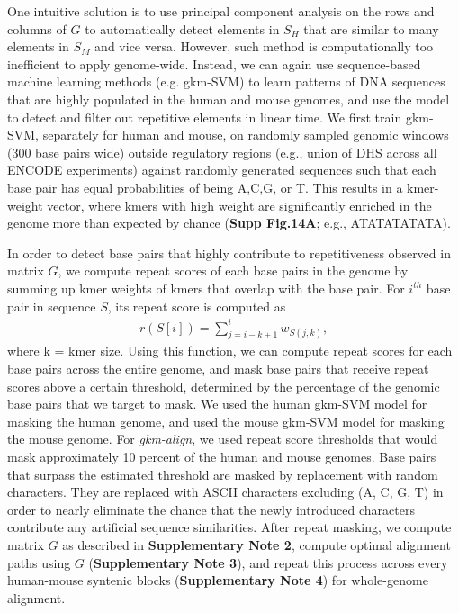 \documentclass[english]{article}
\begin{document}
One intuitive solution is to use principal component analysis on the rows and columns of $G$ to automatically detect elements in $S_H$ that are similar to many elements in $S_M$ and vice versa. However, such method is computationally too inefficient to apply genome-wide. Instead, we can again use sequence-based machine learning methods (e.g. gkm-SVM) to learn patterns of DNA sequences that are highly populated in the human and mouse genomes, and use the model to detect and filter out repetitive elements in linear time.
We first train gkm-SVM, separately for human and mouse, on randomly sampled genomic windows (300 base pairs wide) outside regulatory regions (e.g., union of DHS across all ENCODE experiments) against randomly generated sequences such that each base pair has equal probabilities of being A,C,G, or T. This results in a kmer-weight vector, where kmers with high weight are significantly enriched in the genome more than expected by chance (\textbf{Supp Fig.14A}; e.g., ATATATATATA).

In order to detect base pairs that highly contribute to repetitiveness observed in matrix $G$,  we compute repeat scores of each base pairs in the genome by summing up kmer weights of kmers that overlap with the base pair. For $i^{th}$ base pair in sequence $S$, its repeat score is computed as 
\begin{align*}
    r(S[i]) = \sum_{j=i-k+1}^{i} w_{S(j,k)},
\end{align*}
where k = kmer size. Using this function, we can compute repeat scores for each base pairs across the entire genome, and mask base pairs that receive repeat scores above a certain threshold, determined by the percentage of the genomic base pairs that we target to mask. We used the human gkm-SVM model for masking the human genome, and used the mouse gkm-SVM model for masking the mouse genome. For \textit{gkm-align}, we used repeat score thresholds that would mask approximately 10 percent of the human and mouse genomes. Base pairs that surpass the estimated threshold are masked by replacement with random characters. They are replaced with ASCII characters excluding (A, C, G, T) in order to nearly eliminate the chance that the newly introduced characters contribute any artificial sequence similarities. After repeat masking, we compute matrix $G$ as described in \textbf{Supplementary Note 2}, compute optimal alignment paths using $G$ (\textbf{Supplementary Note 3}), and repeat this process across every human-mouse syntenic blocks (\textbf{Supplementary Note 4}) for whole-genome alignment.
\end{document}
